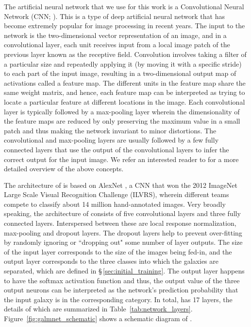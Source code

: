 The artificial neural network that we use for this work is a Convolutional Neural Network (CNN; \citealp{fukushima_80, lecun_98}). This is a type of deep artificial neural network that has become extremely popular for image processing in recent years. The input to the network is the two-dimensional vector representation of an image, and in a convolutional layer, each unit receives input from a local image patch of the previous layer known as the receptive field. Convolution involves taking a filter of a particular size and repeatedly applying it (by moving it with a specific stride) to each part of the input image, resulting in a two-dimensional output map of activations called a feature map. The different units in the feature map share the same weight matrix, and hence, each feature map can be interpreted as trying to locate a particular feature at different locations in the image. Each convolutional layer is typically followed by a max-pooling layer wherein the dimensionality of the feature maps are reduced by only preserving the maximum value in a small patch and thus making the network invariant to minor distortions. The convolutional and max-pooling layers are usually followed by a few fully connected layers that use the output of the convolutional layers to infer the correct output for the input image. We refer an interested reader to \citet{nielsen} for a more detailed overview of the above concepts.

The architecture of \gamornet{} is based on AlexNet \citep{alexnet}, a CNN that won the 2012 ImageNet Large Scale Visual Recognition Challenge (ILVRS), wherein different teams compete to classify about 14 million hand-annotated images. Very broadly speaking, the architecture of \gamornet{} consists of five convolutional layers and three fully connected layers. Interspersed between these are local response normalization, max-pooling and dropout layers. The dropout layers help to prevent over-fitting by randomly ignoring or ``dropping out" some number of layer outputs. The size of the input layer corresponds to the size of the images being fed-in, and the output layer corresponds to the three classes into which the galaxies are separated, which are defined in \S\,\ref{sec:initial_training}. The output layer happens to have the softmax activation function and thus, the output value of the three output neurons can be interpreted as the network's prediction probability that the input galaxy is in the corresponding category. In total, \gamornet{} has 17 layers, the details of which are summarized in Table~\ref{tab:network_layers}. Figure~\ref{fig:galmnet_schematic} shows a schematic diagram of \gamornet{}.

